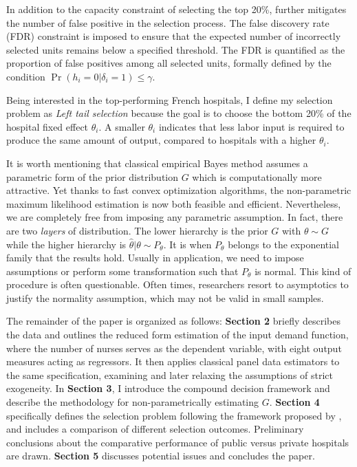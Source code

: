 \documentclass[12pt]{article}
\begin{document}
In addition to the capacity constraint of selecting the top 20\%,
\citet{gu2023invidious} further mitigates the number of false positive in the
selection process. The false discovery rate (FDR) constraint is imposed to
ensure that the expected number of incorrectly selected units remains below a
specified threshold. The FDR is quantified as the proportion of false positives
among all selected units, formally defined by the condition
$\Pr(h_i=0|\delta_i=1) \leq \gamma$.

Being interested in the top-performing French hospitals, I define my selection
problem as \textit{Left tail selection} because the goal is to choose the
bottom 20\% of the hospital fixed effect $\theta_i$. A smaller $\theta_i$
indicates that less labor input is required to produce the same amount of
output, compared to hospitals with a higher $\theta_i$.

It is worth mentioning that classical empirical Bayes method assumes a
parametric form of the prior distribution $G$ which is computationally more
attractive. Yet thanks to fast convex optimization algorithms, the
non-parametric maximum likelihood estimation is now both feasible and
efficient. Nevertheless, we are completely free from imposing any parametric
assumption. In fact, there are two \textit{layers} of distribution. The lower
hierarchy is the prior $G$ with $\theta\sim G$ while the higher hierarchy is
$\hat{\theta}|\theta \sim P_{\theta}$. It is when $P_{\theta}$ belongs to the
exponential family that the \citet{lindsay1995mixture} results hold. Usually in
application, we need to impose assumptions or perform some transformation such
that $P_{\theta}$ is normal. This kind of procedure is often questionable.
Often times, researchers resort to asymptotics to justify the normality
assumption, which may not be valid in small samples.

The remainder of the paper is organized as follows: \textbf{Section 2} briefly
describes the data and outlines the reduced form estimation of the input demand
function, where the number of nurses serves as the dependent variable, with
eight output measures acting as regressors. It then applies classical panel
data estimators to the same specification, examining and later relaxing the
assumptions of strict exogeneity. In \textbf{Section 3}, I introduce the
compound decision framework and describe the methodology for non-parametrically
estimating $G$. \textbf{Section 4} specifically defines the selection problem
following the framework proposed by \cite{gu2023invidious}, and includes a
comparison of different selection outcomes. Preliminary conclusions about the
comparative performance of public versus private hospitals are drawn.
\textbf{Section 5} discusses potential issues and concludes the paper.
\end{document}
